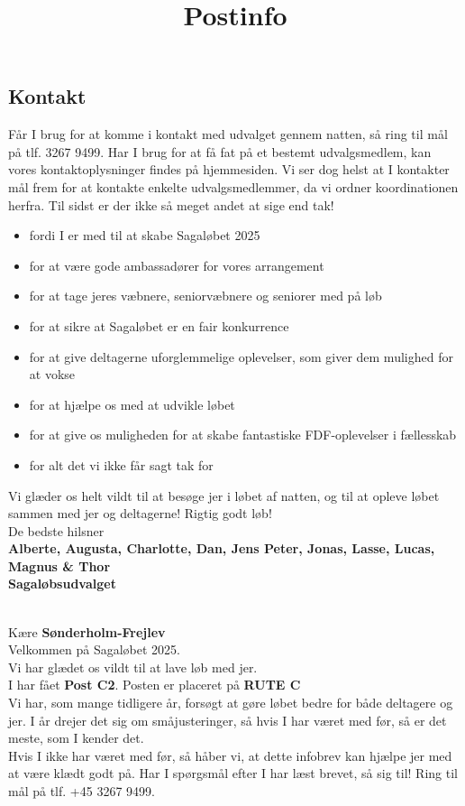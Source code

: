 \subsection{Kontakt}
Får I brug for at komme i kontakt med udvalget gennem natten, så ring til mål på tlf. 3267 9499. Har I brug for at få fat på et bestemt udvalgsmedlem, kan vores kontaktoplysninger findes på hjemmesiden. Vi ser dog helst at I kontakter mål frem for at kontakte enkelte udvalgsmedlemmer, da vi ordner koordinationen herfra.
\newline
Til sidst er der ikke så meget andet at sige end tak!\begin{itemize}
  \item fordi I er med til at skabe Sagaløbet 2025
  \item for at være gode ambassadører for vores arrangement
  \item for at tage jeres væbnere, seniorvæbnere og seniorer med på løb
  \item for at sikre at Sagaløbet er en fair konkurrence
  \item for at give deltagerne uforglemmelige oplevelser, som giver dem mulighed for at vokse
  \item for at hjælpe os med at udvikle løbet
  \item for at give os muligheden for at skabe fantastiske FDF-oplevelser i fællesskab
  \item for alt det vi ikke får sagt tak for
\end{itemize}
Vi glæder os helt vildt til at besøge jer i løbet af natten, og til at opleve løbet sammen med jer og deltagerne!
\newline
Rigtig godt løb!\\
\newline
\textcolor{søblå}{De bedste hilsner}\\
\textcolor{natblå}{\textbf{Alberte, Augusta, Charlotte, Dan, Jens Peter, Jonas, Lasse, Lucas, Magnus \& Thor}}\\
\textcolor{natblå}{\textbf{Sagaløbsudvalget}}\\
\newpage
\title{Postinfo}\\
Kære \textbf{Sønderholm-Frejlev}\\
\newline
Velkommen på Sagaløbet 2025.\\
Vi har glædet os vildt til at lave løb med jer.\\
\newline
I har fået \textbf{Post C2}. Posten er placeret på \textbf{RUTE C}\\
Vi har, som mange tidligere år, forsøgt at gøre løbet bedre for både deltagere og jer. I år drejer det sig om småjusteringer, så hvis I har været med før, så er det meste, som I kender det.\\
\newline
Hvis I ikke har været med før, så håber vi, at dette infobrev kan hjælpe jer med at være klædt godt på. Har I spørgsmål efter I har læst brevet, så sig til! Ring til mål på tlf. +45 3267 9499.
